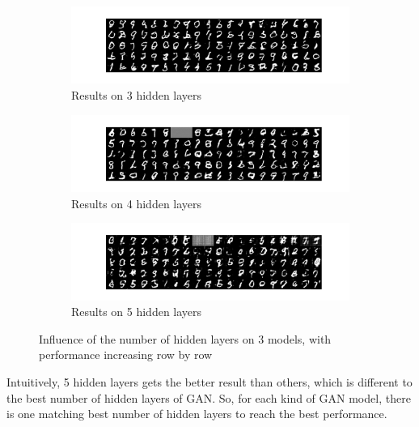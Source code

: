 \documentclass[12pt,letterpaper]{article}
\begin{document}
\begin{figure}[h]
    \begin{subfigure}{0.49\textwidth}
    \includegraphics[width=\linewidth]{WGAN_MNIST_0_100_256.png}
    \caption{\small Results on 3 hidden layers} \label{fig:a}
    \end{subfigure}\hspace*{\fill}
    \begin{subfigure}{0.49\textwidth}
    \includegraphics[width=\linewidth]{WGAN_MNIST_1_100_256.png}
    \caption{\small Results on 4 hidden layers} \label{fig:b}
    \end{subfigure}

    \medskip
    \begin{subfigure}{0.49\textwidth}
    \includegraphics[width=\linewidth]{WGAN_MNIST_2_100_256.png}
    \caption{\small Results on 5 hidden layers} \label{fig:c}
    \end{subfigure}\hspace*{\fill}
    \caption{Influence of the number of hidden layers on $3$ models, with performance increasing row by row} \label{fig:MNIST_WGAN_hidden}
\end{figure}

Intuitively, 5 hidden layers gets the better result than others, which is different to the best number of hidden layers of GAN. So, for each kind of GAN model, there is one matching best number of hidden layers to reach the best performance.
\end{document}
